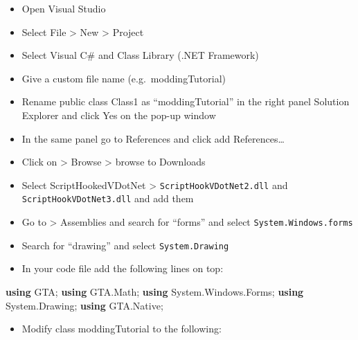 \documentclass[
  openany]{book}
\newenvironment{Shaded}{\begin{snugshade}}{\end{snugshade}}
\newcommand{\FunctionTok}[1]{\textcolor[rgb]{0.00,0.00,0.00}{#1}}
\newcommand{\KeywordTok}[1]{\textcolor[rgb]{0.13,0.29,0.53}{\textbf{#1}}}
\newcommand{\NormalTok}[1]{#1}
\providecommand{\tightlist}{%
  \setlength{\itemsep}{0pt}\setlength{\parskip}{0pt}}
\begin{document}
\begin{itemize}
\item
  Open Visual Studio
\item
  Select File \textgreater{} New \textgreater{} Project
\item
  Select Visual C\# and Class Library (.NET Framework)
\item
  Give a custom file name (e.g.~moddingTutorial)
\item
  Rename public class Class1 as ``moddingTutorial'' in the right panel Solution Explorer and click Yes on the pop-up window
\item
  In the same panel go to References and click add References\ldots{}
\item
  Click on \textgreater{} Browse \textgreater{} browse to Downloads
\item
  Select ScriptHookedVDotNet \textgreater{} \texttt{ScriptHookVDotNet2.dll} and \texttt{ScriptHookVDotNet3.dll} and add them
\item
  Go to \textgreater{} Assemblies and search for ``forms'' and select \texttt{System.Windows.forms}
\item
  Search for ``drawing'' and select \texttt{System.Drawing}
\item
  In your code file add the following lines on top:
\end{itemize}

\begin{Shaded}
\begin{Highlighting}[]
\KeywordTok{using}\NormalTok{ GTA;}
\KeywordTok{using}\NormalTok{ GTA.}\FunctionTok{Math}\NormalTok{;}
\KeywordTok{using}\NormalTok{ System.}\FunctionTok{Windows}\NormalTok{.}\FunctionTok{Forms}\NormalTok{;}
\KeywordTok{using}\NormalTok{ System.}\FunctionTok{Drawing}\NormalTok{;}
\KeywordTok{using}\NormalTok{ GTA.}\FunctionTok{Native}\NormalTok{;}
\end{Highlighting}
\end{Shaded}

\begin{itemize}
\tightlist
\item
  Modify class moddingTutorial to the following:
\end{itemize}
\end{document}
